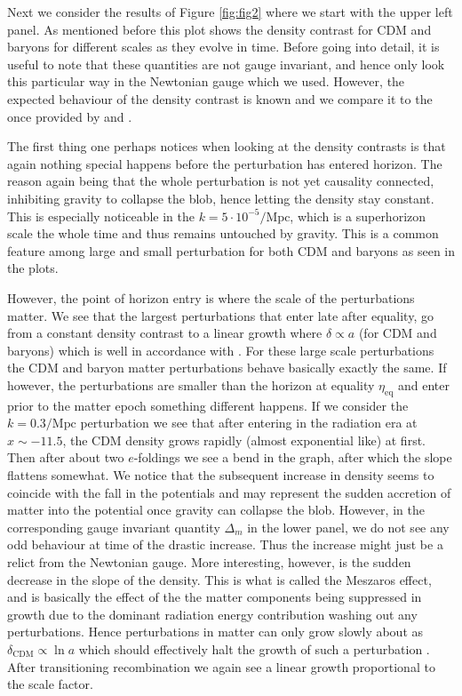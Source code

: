 \documentclass[twocolumn]{aastex62}
\begin{document}
Next we consider the results of Figure \ref{fig:fig2} where we start with the upper left panel. As mentioned before this plot shows the density contrast for CDM and baryons for different scales as they evolve in time. Before going into detail, it is useful to note that these quantities are not gauge invariant, and hence only look this particular way in the Newtonian gauge which we used. However, the expected behaviour of the density contrast is known and we compare it to the once provided by \cite{dodelson:2003} and \cite{baumann:2014}. 

The first thing one perhaps notices when looking at the density contrasts is that again nothing special happens before the perturbation has entered horizon. The reason again being that the whole perturbation is not yet causality connected, inhibiting gravity to collapse the blob, hence letting the density stay constant. This is especially noticeable in the $k = 5\cdot 10^{-5} / \mathrm{Mpc}$, which is a superhorizon scale the whole time and thus remains untouched by gravity. This is a common feature among large and small perturbation for both CDM and baryons as seen in the plots. 

However, the point of horizon entry is where the scale of the perturbations matter. We see that the largest perturbations that enter late after equality, go from a constant density contrast to a linear growth where $\delta\propto a$ (for CDM and baryons) which is well in accordance with \cite{baumann:2014}. For these large scale perturbations the CDM and baryon matter perturbations behave basically exactly the same. If however, the perturbations are smaller than the horizon at equality $\eta_\text{eq}$ and enter prior to the matter epoch something different happens. If we consider the $k = 0.3 /\mathrm{Mpc}$ perturbation we see that after entering in the radiation era at $x\sim-11.5$, the CDM density grows rapidly (almost exponential like) at first. Then after about two $e$-foldings we see a bend in the graph, after which the slope flattens somewhat. We notice that the subsequent increase in density seems to coincide with the fall in the potentials and may represent the sudden accretion of matter into the potential once gravity can collapse the blob. However, in the corresponding gauge invariant quantity $\Delta_m$ in the lower panel, we do not see any odd behaviour at time of the drastic increase. Thus the increase might just be a relict from the Newtonian gauge. More interesting, however, is the sudden decrease in the slope of the density. This is what is called the Meszaros effect, and is basically the effect of the the matter components being suppressed in growth due to the dominant radiation energy contribution washing out any perturbations. Hence perturbations in matter can only grow slowly about as $\delta_\mathrm{CDM}\propto \ln a$ which should effectively halt the growth of such a perturbation \cite{dodelson:2003}. After transitioning recombination we again see a linear growth proportional to the scale factor. 
\end{document}
